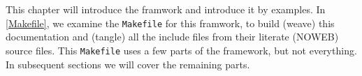 This chapter will introduce the framwork and introduce it by examples.
In \cref{Makefile}, we examine the \verb'Makefile' for this framwork, \ie to 
build (weave) this documentation and (tangle) all the include files from their 
literate (NOWEB) source files.
This \verb'Makefile' uses a few parts of the framework, but not everything.
In subsequent sections we will cover the remaining parts.



